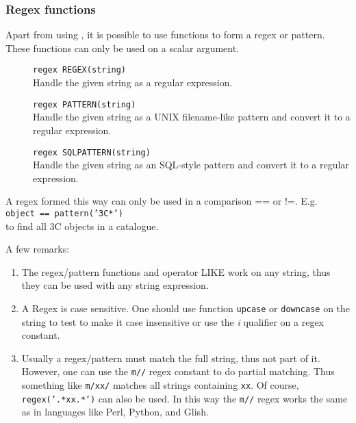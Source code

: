 \subsubsection{Regex functions}
Apart from using ,
it is possible to use functions to form a regex or pattern.
These functions can only be used on a scalar argument.

\begin{description}
  \item[] \texttt{regex REGEX(string)}\\
       Handle the given string as a regular expression.
  \item[] \texttt{regex PATTERN(string)}\\
       Handle the given string as a UNIX filename-like pattern and
       convert it to a regular expression.
  \item[] \texttt{regex SQLPATTERN(string)}\\
       Handle the given string as an SQL-style pattern and
       convert it to a regular expression.
\end{description}
A regex formed this way can only be used in a comparison == or !=. E.g.
\\\texttt{object == pattern('3C*')}
\\to find all 3C objects in a catalogue.

A few remarks:
\begin{enumerate}
\item The regex/pattern functions and operator LIKE work on any string,
thus they can be used with any string expression.
\item A Regex is case sensitive. One should use 
function \texttt{upcase} or \texttt{downcase} on the string to test to
make it case insensitive or use the \textit{i} qualifier on a regex constant.
\item Usually a regex/pattern must match the full string, thus not part of
it. However, one can use the \texttt{m//} regex constant to do partial
matching. Thus something like \texttt{m/xx/} matches all strings
containing \texttt{xx}. Of course, \texttt{regex('.*xx.*')} can also be used.
In this way the \texttt{m//} regex works the same as in languages like
Perl, Python, and Glish. 
\end{enumerate}


